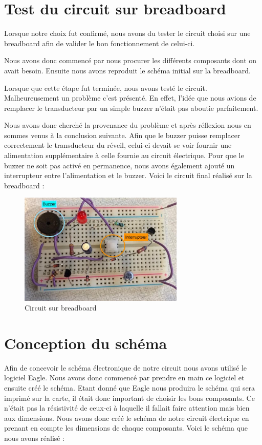 \chapter{Test du circuit sur breadboard}

Lorsque notre choix fut confirmé, nous avons du tester le circuit choisi sur une breadboard afin de valider le bon fonctionnement de celui-ci. 

Nous avons donc commencé par nous procurer les différents composants dont on avait besoin. Ensuite nous avons reproduit le schéma initial sur la breadboard.

Lorsque que cette étape fut terminée, nous avons testé le circuit. Malheureusement un problème c'est présenté. En effet, l'idée que nous avions de remplacer le transducteur par un simple buzzer n'était pas aboutie parfaitement. 

Nous avons donc cherché la provenance du problème et après réflexion nous en sommes venus à la conclusion suivante. Afin que le buzzer puisse remplacer correctement le transducteur du réveil, celui-ci devait se voir fournir une alimentation supplémentaire à celle fournie au circuit électrique. Pour que le buzzer ne soit pas activé en permanence, nous avons également ajouté un interrupteur entre l'alimentation et le buzzer. Voici le circuit final réalisé sur la breadboard : 

\begin{figure}[H]
\centering
\includegraphics[width=0.7\textwidth]{ressources/breadboardElement}
\caption{Circuit sur breadboard}
\end{figure}

\chapter{Conception du schéma}

Afin de concevoir le schéma électronique de notre circuit nous avons utilisé le logiciel Eagle. Nous avons donc commencé par prendre en main ce logiciel et ensuite créé le schéma.  Etant donné que Eagle nous produira le schéma qui sera imprimé sur la carte, il était donc important de choisir les bons composants. Ce n'était pas la résistivité de ceux-ci à laquelle il fallait faire attention mais bien aux dimensions. Nous avons donc créé le schéma de notre circuit électrique en prenant en compte les dimensions de chaque composants. Voici le schéma que nous avons réalisé : 


